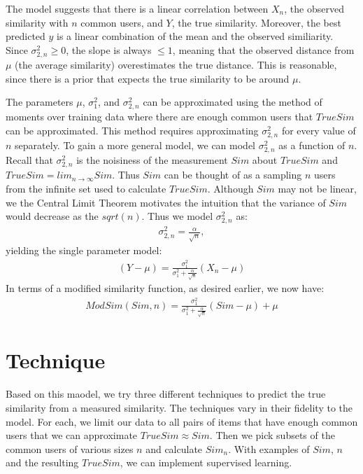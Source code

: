 \documentclass[11pt]{article}
\begin{document}
The model suggests that there is a linear correlation between $X_n$, the
observed similarity with $n$ common users, and $Y$, the true similarity.
Moreover, the best predicted $y$ is a linear combination of the mean and the
observed similiarity. Since $\sigma_{2,n}^2\ge0$, the slope is always $\le1$, 
meaning that the observed distance from $\mu$ (the average similarity) 
overestimates the true distance. This is reasonable, since there is a prior 
that expects the true similarity to be around $\mu$.

The parameters $\mu$, $\sigma_{1}^2$, and $\sigma_{2,n}^2$ can be approximated 
using the method of moments over training data where there are enough common
users that $TrueSim$ can be approximated. This method requires approximating
$\sigma_{2,n}^2$ for every value of $n$ separately. To gain a more general 
model, we can model $\sigma_{2,n}^2$ as a function of $n$. Recall that 
$\sigma_{2,n}^2$ is the noisiness of the measurement $Sim$ about $TrueSim$ and $TrueSim = lim_{n \to
\infty}Sim$. Thus $Sim$ can be thought of as a sampling $n$ users from the
infinite set used to calculate $TrueSim$. Although $Sim$ may not be linear, we
the Central Limit Theorem motivates the intuition that the variance of $Sim$
would decrease as the $sqrt(n)$. Thus we model $\sigma_{2,n}^2$ as:
\begin{align}
\sigma_{2,n}^2 = \frac{\alpha}{\sqrt{n}},
\end{align}
yielding the single parameter model:
\begin{align}
\left(Y - \mu\right) = \frac{\sigma_{1}^2}{\sigma_{1}^2+\frac{\alpha}{\sqrt{n}}}
\left(X_n-\mu\right)
\end{align}
In terms of a modified similarity function, as desired earlier, we now have:
\begin{align}
ModSim(Sim, n) = \frac{\sigma_{1}^2}{\sigma_{1}^2+\frac{\alpha}{\sqrt{n}}}
\left(Sim-\mu\right) + \mu
\end{align}

\section*{Technique}
Based on this maodel, we try three different techniques to predict the true similarity from a
measured similarity. The techniques vary in their fidelity to the model. For
each, we limit our data to all pairs of items that have enough common users that
we can approximate $TrueSim \approx Sim$. Then we pick subsets of the common
users of various sizes $n$ and calculate $Sim_{n}$. With examples of $Sim$, $n$
and the resulting $TrueSim$, we can implement supervised learning.
\end{document}
